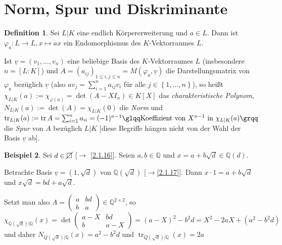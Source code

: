 \documentclass[
twoside=semi,
fontsize=12,
DIV=12, 
cleardoublepage=current,
leqno,
headings=optiontoheadandtoc, 
toc=idx
]{scrbook}
\newcommand{\Q}{\mathbb{Q}}
\newcommand{\nsquare}{\cancel{\square}}
\newcommand{\set}[1]{\left\{ #1 \right\}}
\DeclareMathOperator{\tr}{tr}
\theoremstyle{definition}
\newtheorem{definition}{Definition}[section]
\newtheorem{beispiel}[definition]{Beispiel}
\begin{document}
   	\section{Norm, Spur und Diskriminante}
   	\begin{definition}\label{2.4.1}
   		Sei $L|K$ eine endlich K\"orpererweiterung und $a \in L$. Dann ist $\varphi_a:L \to L, x \mapsto ax$ ein Endomorphismus des $K$-Vektorraumes $L$.
   		
   		Ist $\underline{v} = (v_1, \dots, v_n)$ eine beliebige Basis des $K$-Vektorraumes $L$ (insbesondere $n = [L:K]$) und $A = (a_{ij})_{1\leq i,j \leq n} = M(\varphi_a, \underline{v})$ die Darstellungsmatrix von $\varphi_a$ bez\"uglich $\underline{v}$ (also $av_j = \sum_{i=1}^{n} a_{ij}v_i$ f\"ur alle $j \in \set{1,\dots, n}$), so hei\ss t $\chi_{L|K}(a) := \chi_{\varphi(a)} = \det (A-XI_n) \in K[X]$ das \emph{charakteristische Polynom},
   		$N_{L|K}(a) := \det(A) = \chi_{L|K}(0)$ die \emph{Norm} und $\tr_{L|K}(a) := \tr A = \sum_{i=1}^n a_{ii} = (-1)^{n-1}\glqq\textrm{Koeffizient von } X^{n-1} \textrm{ in } \chi_{L|K}(a)\grqq$ die \emph{Spur} von $A$ bez\"uglich $L|K$ [diese Begriffe h\"angen nicht von der Wahl der Basis $\underline{v}$ ab].
   	\end{definition}
   	
   	\begin{beispiel}\label{2.4.2}
   		Sei $d \in \nsquare$ [$\to$ \ref{2.1.16}]. Seien $a,b \in \Q$ und $x = a + b\sqrt{d} \in \Q(d)$.
   		
   		Betrachte Basis $\underline{v}= (1,\sqrt{d})$ von $\Q(\sqrt{d})$ [$\to$\ref{2.1.17}]. Dann $x\cdot 1 = a + b\sqrt{d}$ und $x \sqrt{d} = bd + a\sqrt{d}$.
   		
   		Setzt man also $A = \begin{pmatrix}
   			a&bd\\b&a
   		\end{pmatrix} \in \Q^{2\times 2}$, so $\chi_{\Q(\sqrt{d})|\Q}(x) = \det \begin{pmatrix}
   		a - X&bd\\b&a - X
   	\end{pmatrix} = (a-X)^2 - b^2d = X^2 - 2aX + (a^2-b^2d)$ und daher $N_{Q(\sqrt{d})|\Q}(x) = a^2-b^2d$ und $\tr_{Q(\sqrt{d})|\Q}(x) = 2a$
   	\end{beispiel}
\end{document}
